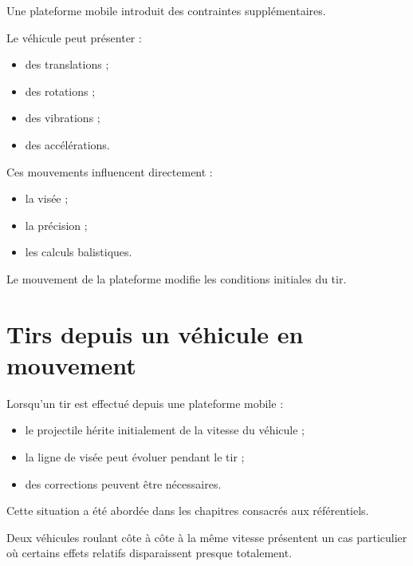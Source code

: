 Une plateforme mobile introduit des contraintes supplémentaires.

Le véhicule peut présenter :

\begin{itemize}
    \item des translations ;
    \item des rotations ;
    \item des vibrations ;
    \item des accélérations.
\end{itemize}

Ces mouvements influencent directement :

\begin{itemize}
    \item la visée ;
    \item la précision ;
    \item les calculs balistiques.
\end{itemize}

\begin{aretenir}

Le mouvement de la plateforme modifie les conditions initiales du tir.

\end{aretenir}

\section{Tirs depuis un véhicule en mouvement}

Lorsqu'un tir est effectué depuis une plateforme mobile :

\begin{itemize}
    \item le projectile hérite initialement de la vitesse du véhicule ;
    \item la ligne de visée peut évoluer pendant le tir ;
    \item des corrections peuvent être nécessaires.
\end{itemize}

Cette situation a été abordée dans les chapitres consacrés aux référentiels.

\begin{exemple}

Deux véhicules roulant côte à côte à la même vitesse présentent un cas
particulier où certains effets relatifs disparaissent presque totalement.

\end{exemple}

